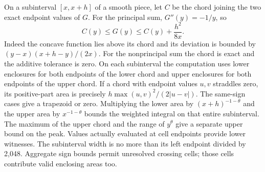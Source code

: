 \documentclass[12pt,letterpaper]{article}
\begin{document}
On a subinterval \([x,x+h]\) of a smooth piece, let \(C\) be the chord joining the two exact endpoint values of \(G\). For the principal sum, \(G''(y)=-1/y\), so
\[
   C(y)\le G(y)\le C(y)+\frac{h^2}{8x}.
\]
Indeed the concave function lies above its chord and its deviation is bounded by \((y-x)(x+h-y)/(2x)\). For the nonprincipal sum the chord is exact and the additive tolerance is zero. On each subinterval the computation uses lower enclosures for both endpoints of the lower chord and upper enclosures for both endpoints of the upper chord. If a chord with endpoint values \(u,v\) straddles zero, its positive-part area is precisely \(h\max(u,v)^2/(2|u-v|)\). The same-sign cases give a trapezoid or zero. Multiplying the lower area by \((x+h)^{-1-\theta}\) and the upper area by \(x^{-1-\theta}\) bounds the weighted integral on that entire subinterval. The maximum of the upper chord and the range of \(y^\theta\) give a separate upper bound on the peak. Values actually evaluated at cell endpoints provide lower witnesses. The subinterval width is no more than its left endpoint divided by 2,048. Aggregate sign bounds permit unresolved crossing cells; those cells contribute valid enclosing areas too.
\end{document}
